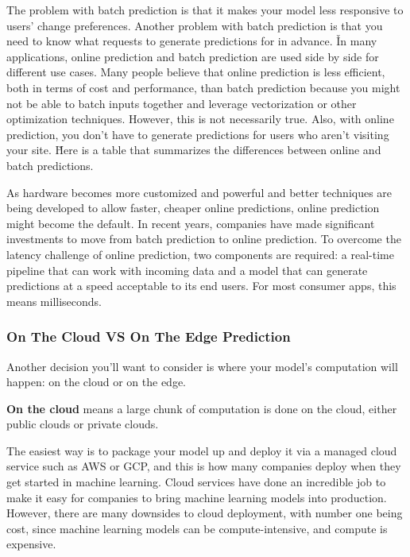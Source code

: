 The problem with batch prediction is that it makes your model less responsive to users' change preferences. Another
problem with batch prediction is that you need to know what requests to generate predictions for in advance. \v

In many applications, online prediction and batch prediction are used side by side for different use cases. Many
people believe that online prediction is less efficient, both in terms of cost and performance, than batch prediction
because you might not be able to batch inputs together and leverage vectorization or other optimization techniques.
However, this is not necessarily true. Also, with online prediction, you don't have to generate predictions for users
who aren't visiting your site. \v

Here is a table that summarizes the differences between online and batch predictions.


As hardware becomes more customized and powerful and better techniques are being developed to allow faster, cheaper
online predictions, online prediction might become the default. In recent years, companies have made significant
investments to move from batch prediction to online prediction. To overcome the latency challenge of online
prediction, two components are required: a real-time pipeline that can work with incoming data and a model that can
generate predictions at a speed acceptable to its end users. For most consumer apps, this means milliseconds.

\subsubsection{On The Cloud VS On The Edge Prediction}

Another decision you'll want to consider is where your model's computation will happen: on the cloud or on the edge.

\textbf{On the cloud} means a large chunk of computation is done on the cloud, either public clouds or private clouds.
\ed

The easiest way is to package your model up and deploy it via a managed cloud service such as AWS or GCP, and this is
how many companies deploy when they get started in machine learning. Cloud services have done an incredible job to
make it easy for companies to bring machine learning models into production. However, there are many downsides to
cloud deployment, with number one being cost, since machine learning models can be compute-intensive, and compute is
expensive.


